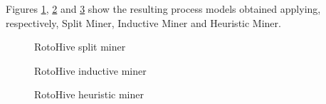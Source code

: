 Figures \ref{images:roto_split}, \ref{images:roto_inductive} and \ref{images:roto_heuristic} show the resulting process models 
obtained applying, respectively, Split Miner, Inductive Miner and Heuristic Miner.

\begin{figure}[!ht]
    \centering
    \caption{RotoHive split miner}
    \label{images:roto_split}
\end{figure}

\begin{figure}[!ht]
    \centering
    \caption{RotoHive inductive miner}
    \label{images:roto_inductive}
\end{figure}

\begin{figure}[!ht]
    \centering
    \caption{RotoHive heuristic miner}
    \label{images:roto_heuristic}
\end{figure}


